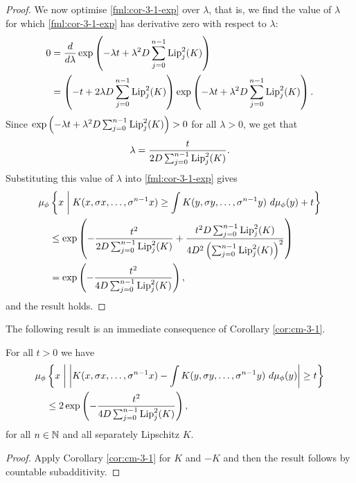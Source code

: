 \begin{corollary}
\begin{proof}
		We now optimise \eqref{fml:cor-3-1-exp} over $\lambda$, that is, we find the value of $\lambda$ for which \eqref{fml:cor-3-1-exp} has derivative zero with respect to $\lambda$:
		\begin{align*}
			0 &= \frac{d}{d\lambda} \exp\left(-\lambda t + \lambda^2 D \sum_{j = 0}^{n - 1}{\operatorname{Lip}_j^2(K)}\right) \\
				&= \left(-t + 2\lambda D \sum_{j = 0}^{n - 1}{\operatorname{Lip}_j^2(K)}\right) \exp\left(-\lambda t + \lambda^2 D \sum_{j = 0}^{n - 1}{\operatorname{Lip}_j^2(K)}\right).
		\end{align*}
		Since $\exp\left(-\lambda t + \lambda^2 D \sum_{j = 0}^{n - 1}{\operatorname{Lip}_j^2(K)}\right) > 0$ for all $\lambda > 0$, we get that
		\[
			\lambda = \frac{t}{2D \sum_{j = 0}^{n - 1}{\operatorname{Lip}_j^2(K)}}.
		\]
		Substituting this value of $\lambda$ into \eqref{fml:cor-3-1-exp} gives
		\begin{align*}
			\mu_\phi&\left\{x \midmid K(x, \sigma{x}, \dots, \sigma^{n - 1}{x}) \geq \int{K(y, \sigma{y}, \dots, \sigma^{n - 1}{y})\ d\mu_\phi(y)} + t\right\} \\
			 &\leq \exp\left(-\frac{t^2}{2D \sum_{j = 0}^{n - 1}{\Lip_j^2(K)}} + \frac{t^2 D \sum_{j = 0}^{n - 1}{\Lip_j^2(K)}}{4D^2 \left(\sum_{j = 0}^{n - 1}{\Lip_j^2(K)}\right)^2}\right) \\
			 &= \exp\left(-\frac{t^2}{4D\sum_{j = 0}^{n - 1}{\Lip_j^2(K)}}\right),
		\end{align*}
		and the result holds.
	\end{proof}
\end{corollary}

The following result is an immediate consequence of Corollary \ref{cor:cm-3-1}.

\begin{corollary}\label{cor:cm-3-1-5}
	For all $t > 0$ we have
	\begin{align}\label{fml:cm-4-5}
		\mu_\phi&\left\{x \midmid \left| K(x, \sigma{x}, \dots, \sigma^{n - 1}{x}) - \int{K(y, \sigma{y}, \dots, \sigma^{n - 1}{y})\ d\mu_\phi(y)} \right| \geq t\right\} \nonumber \\
		&\leq 2\exp\left(-\frac{t^2}{4D\sum_{j = 0}^{n - 1}{\Lip_j^2(K)}}\right),
	\end{align}
	for all $n \in \mathbb{N}$ and all separately Lipschitz $K$.
	\begin{proof}
		Apply Corollary \ref{cor:cm-3-1} for $K$ and $-K$ and then the result follows by countable subadditivity.
	\end{proof}
\end{corollary}

